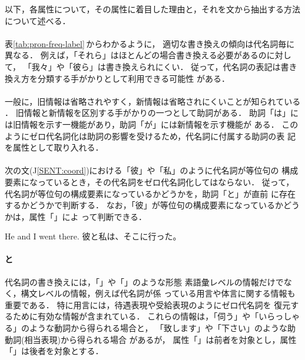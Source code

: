 以下，各属性について，その属性に着目した理由と，それを文から抽出する方法
について述べる．

\paragraph{\PRON}

表\ref{tab:pron-freq-label}\,からわかるように，
適切な書き換えの傾向は代名詞毎に異なる．
例えば，「それら」はほとんどの場合書き換える必要があるのに対して，
「我々」や「彼ら」は書き換えられにくい．
従って，代名詞の表記は書き換え方を分類する手がかりとして利用できる可能性
がある．

\paragraph{\FZKG}

一般に，旧情報は省略されやすく，新情報は省略されにくいことが知られている
\cite{Kuno78}．
旧情報と新情報を区別する手がかりの一つとして助詞がある．
助詞「は」には旧情報を示す一機能があり，助詞「が」には新情報を示す機能が
ある．
このようにゼロ代名詞化は助詞の影響を受けるため，代名詞に付属する助詞の表
記を属性として取り入れる．

\paragraph{\COORD}

次の文(J\ref{SENT:coord})における「彼」や「私」のように代名詞が等位句の
構成要素になっているとき，その代名詞をゼロ代名詞化してはならない．
従って，代名詞が等位句の構成要素になっているかどうかを，助詞「と」が直前
に存在するかどうかで判断する．
なお，「彼」が等位句の構成要素になっているかどうかは，属性「\FZKG」によ
って判断できる．
\begin{SENT}
\sentE He and I went there.
\sentJ 彼と私は、そこに行った。
\label{SENT:coord}
\end{SENT}

\paragraph{\GVNRSEM
と\GVNRFZKG}

代名詞の書き換えには，「\PRON」や「\FZKG」のような形態
素語彙レベルの情報だけでなく，構文レベルの情報，例えば代名詞が係
っている用言や体言に関する情報も重要である．
特に用言には，待遇表現\cite{Mizutani83}や受給表現のようにゼロ代名詞を
復元するために有効な情報が含まれている．
これらの情報は，「伺う」や「いらっしゃる」のような動詞から得られる場合と，
「致します」や「下さい」のような助動詞(相当表現)から得られる場合
\cite{Kudo93,Nakaiwa96}があるが，
属性「\GVNRSEM」は前者を対象とし，属性「\GVNRFZKG」は後者を対象とする．

